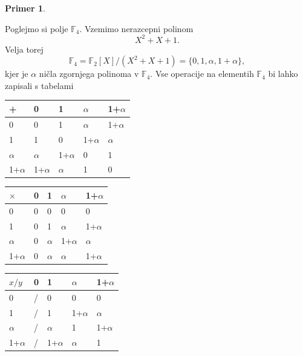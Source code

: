 \documentclass[12pt,a4paper,twoside]{article}
\theoremstyle{definition} %
\newtheorem{primer}[definicija]{Primer}
\theoremstyle{plain} %
\numberwithin{equation}{section}  %
\newcommand{\F}{\mathbb F}
\begin{document}
\begin{primer}~

Poglejmo si polje $\F_4$. Vzemimo nerazcepni polinom
$$X^2+X+1.$$
Velja torej
$$\F_4 = \F_2[X]/(X^2+X+1) = \{ 0,1,\alpha,1 +\alpha \},$$
kjer je $\alpha$ ničla zgornjega polinoma v $\F_4$.
Vse operacije na elementih $\F_4$ bi lahko zapisali s tabelami


\begin{table}[H]
  \centering
\begin{minipage}{.5\textwidth}
 \begin{tabular}{l|llll}
+          & 0          & 1          & $\alpha$   & 1+$\alpha$ \\ \hline
0          & 0          & 1          & $\alpha$   & 1+$\alpha$ \\
1          & 1          & 0          & 1+$\alpha$ & $\alpha$   \\
$\alpha$   & $\alpha$   & 1+$\alpha$ & 0          & 1          \\
1+$\alpha$ & 1+$\alpha$ & $\alpha$   & 1          & 0         
\end{tabular}
  \label{table:ses}
\end{minipage}%
\begin{minipage}{.5\textwidth}
\centering
\begin{tabular}{l|llll}
$\times$   & 0 & 1        & $\alpha$   & 1+$\alpha$ \\ \hline
0          & 0 & 0        & 0          & 0          \\
1          & 0 & 1        & $\alpha$   & 1+$\alpha$ \\
$\alpha$   & 0 & $\alpha$ & 1+$\alpha$ & $\alpha$   \\
1+$\alpha$ & 0 & $\alpha$ & $\alpha$   & 1+$\alpha$
\end{tabular}
\label{table:mno}
\end{minipage}
\end{table}


\begin{table}[H]
\begin{tabular}{l|llll}
$x/y$      & 0 & 1          & $\alpha$   & 1+$\alpha$ \\ \hline
0          & / & 0          & 0          & 0          \\
1          & / & 1          & 1+$\alpha$ & $\alpha$   \\
$\alpha$   & / & $\alpha$   & 1          & 1+$\alpha$ \\
1+$\alpha$ & / & 1+$\alpha$ & $\alpha$   & 1         
\end{tabular}
\label{table:delj}
\end{table}
\end{primer}
\end{document}
